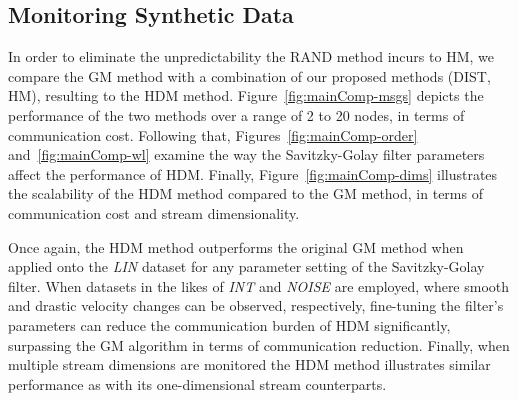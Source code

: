\subsection{Monitoring Synthetic Data} \label{subsec:mainComp}

In order to eliminate the unpredictability the RAND method incurs to HM, we compare the GM method with a combination of our proposed methods (DIST, HM), resulting to the HDM method. Figure~\ref{fig:mainComp-msgs} depicts the performance of the two methods over a range of 2 to 20 nodes, in terms of communication cost. Following that, Figures~\ref{fig:mainComp-order} and~\ref{fig:mainComp-wl} examine the way the Savitzky-Golay filter parameters affect the performance of HDM. Finally, Figure~\ref{fig:mainComp-dims} illustrates the scalability of the HDM method compared to the GM method, in terms of communication cost and stream dimensionality.

Once again, the HDM method outperforms the original GM method when applied onto the \emph{LIN} dataset for any parameter setting of the Savitzky-Golay filter. When datasets in the likes of \emph{INT} and \emph{NOISE} are employed, where smooth and drastic velocity changes can be observed, respectively, fine-tuning the filter's parameters can reduce the communication burden of HDM significantly, surpassing the GM algorithm in terms of communication reduction. Finally, when multiple stream dimensions are monitored the HDM method illustrates similar performance as with its one-dimensional stream counterparts.

